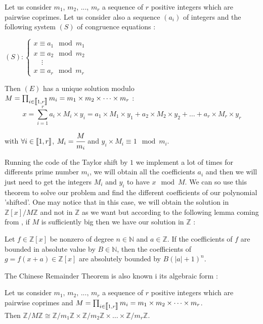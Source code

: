 \begin{crt1}
Let us consider $m_1$, $m_2$, ..., $m_r$ a sequence of $r$ positive integers which are pairwise coprimes. Let us consider also a sequence $(a_i)$ of integers and the following system $(S)$ of congruence equations :
\begin{center}
$(S) : \begin{cases}
x \equiv a_1 \mod m_1 \\
x \equiv a_2 \mod m_2 \\
\;\;\;\;\vdots \\
x \equiv a_r \mod m_r
\end{cases}$
\end{center}

Then $(E)$ has a unique solution modulo $M = \prod_{i\in \mbox{\textlbrackdbl} 1, r\mbox{\textrbrackdbl}}m_i = m_1\times m_2\times \dots \times m_r$ : \\

$$x = \sum_{i=1}^{r} a_i\times M_i \times y_i = a_1 \times M_1 \times y_1 + a_2 \times M_2 \times y_2 + \dots + a_r \times M_r \times y_r$$

with $\forall i \in \mbox{\textlbrackdbl} 1, r\mbox{\textrbrackdbl}$, $M_i = \cfrac{M}{m_i}$ and $y_i\times M_i \equiv 1 \mod m_i$.
\end{crt1}

Running the code of the Taylor shift by $1$ we implement a lot of times for differents prime number $m_i$, we will obtain all the coefficients $a_i$ and then we will just need to get the integers $M_i$ and $y_i$ to have $x \mod M$. We can so use this theorem to solve our problem and find the different coefficients of our polynomial 'shifted'. One may notice that in this case, we will obtain the solution in $\mathbb{Z}[x]/M\mathbb{Z}$ and not in $\mathbb{Z}$ as we want but according to the following lemma coming from \cite{Gerhard}, if $M$ is sufficiently big then we have our solution in $\mathbb{Z}$ :\\

\begin{lemma*}
Let $f \in \mathbb{Z}[x]$ be nonzero of degree $n\in\mathbb{N}$ and $a\in \mathbb{Z}$. If the coefficients of $f$ are bounded in absolute value by $B\in\mathbb{N}$, then the coefficients of $g=f(x+a)\in\mathbb{Z}[x]$ are absolutely bounded by $B(|a|+1)^n$.
\end{lemma*}

The Chinese Remainder Theorem is also known i its algebraic form :\\

\begin{crt2}
Let us consider $m_1,\,m_2,\,...,\, m_r$ a sequence of $r$ positive integers which are pairwise coprimes and $M = \prod_{i\in \mbox{\textlbrackdbl} 1, r\mbox{\textrbrackdbl}}m_i = m_1\times m_2\times \dots \times m_r$.\\ 
Then $\mathbb{Z}/M\mathbb{Z} \cong \mathbb{Z}/m_1\mathbb{Z} \times \mathbb{Z}/m_2\mathbb{Z} \times \dots \times \mathbb{Z}/m_r\mathbb{Z}$.
\end{crt2}


